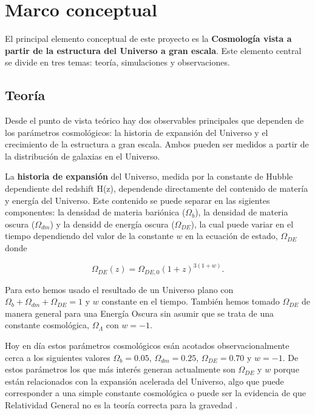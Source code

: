 
\section{Marco conceptual}


El principal elemento conceptual de este proyecto es la {\bf Cosmolog\'ia
vista a partir de la estructura del Universo a gran escala}. Este
elemento central se divide en tres temas: teor\'ia,
simulaciones y observaciones.



\subsection{Teor\'ia}

Desde el punto de vista te\'orico hay dos observables principales que
dependen de los par\'ametros cosmol\'ogicos: la historia de
expansi\'on del Universo y el crecimiento de la estructura a gran
escala. Ambos pueden ser medidos a partir de la distribuci\'on de
galaxias en el Universo.

La {\bf historia de expansi\'on} del Universo, medida por la constante
de Hubble dependiente del redshift H(z), dependende directamente del
contenido de mater\'ia y energ\'ia del Universo. Este contenido se 
puede separar en las sigientes componentes: la densidad de materia
bari\'onica ($\Omega_b$), la densidad de materia oscura
($\Omega_{dm}$) y la densidd de energ\'ia  oscura  ($\Omega_{DE}$), la
cual puede variar en el tiempo dependiendo del valor de la constante
$w$ en la ecuaci\'on de estado, $\Omega_{DE}$ donde 

\begin{equation}
\Omega_{DE}(z) = \Omega_{DE,0}(1+z)^{3(1+w)}.
\end{equation}

Para esto hemos usado el resultado de un Universo plano con
$\Omega_b+\Omega_{dm}+\Omega_{DE}=1$ y $w$ constante en el tiempo.
Tambi\'en hemos tomado $\Omega_{DE}$ de manera general para una
Energ\'ia Oscura sin asumir que se trata de una constante
cosmol\'ogica, $\Omega_\Lambda$ con $w=-1$. 

Hoy en d\'ia estos par\'ametros cosmol\'ogicos es\'an
acotados observacionalmente cerca a los siguientes valores $\Omega_b=0.05$,
$\Omega_{dm}=0.25$, $\Omega_{DE}=0.70$ y $w=-1$. De estos
par\'ametros los que m\'as inter\'es generan actualmente son
$\Omega_{DE}$ y $w$ porque est\'an relacionados con  la expansi\'on
acelerada del Universo, algo que puede corresponder a una simple constante
cosmol\'ogica o puede ser la evidencia de que Relatividad General no
es la teor\'ia correcta para la gravedad 
\cite{2014arXiv1401.0046M}.


